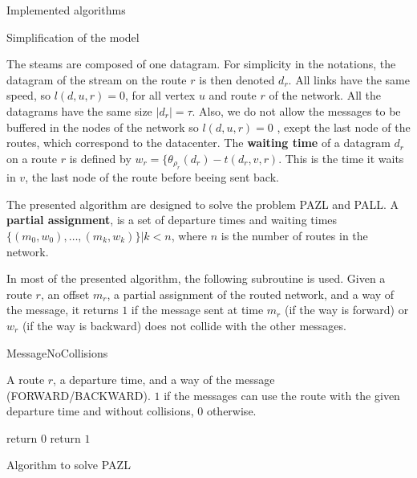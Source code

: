 \documentclass[10pt]{article}
\begin{document}
  \begin{section}{Implemented algorithms}
  
  \begin{subsection}{Simplification of the model}
 
   The steams are composed of one datagram. For simplicity in the notations, the datagram of the stream on the route $r$ is then denoted $d_r$. All links have the same speed, so $l(d,u,r)=0$, for all vertex $u$ and route $r$ of the network. All the datagrams have the same size $|d_r| = \tau$.
   Also, we do not allow the messages to be buffered in the nodes of the network so $l(d,u,r)=0$ , exept the last node of the routes, which correspond to the datacenter.
   The \textbf{waiting time} of a datagram $d_r$ on a route $r$ is defined by $w_r = \{\theta_{\rho_r}(d_r) - t(d_r,v,r)$. This is the time it waits in $v$, the last node of the route before beeing sent back.
   
  \end{subsection}

  The presented algorithm are designed to solve the problem PAZL and PALL.
  A \textbf{partial assignment}, is a set of departure times and waiting times $\{(m_0,w_0),\ldots,(m_k,w_k)\}|k<n$, where $n$ is the number of routes in the network.
  
   
   
  In most of the presented algorithm, the following subroutine is used. Given a route $r$, an offset $m_r$, a partial assignment of the routed network, and a way of the message, it returns $1$ if the message sent at time $m_r$ (if the way is forward) or $w_r$ (if the way is backward)  does not collide with the other messages. 
   	\begin{algorithm}[H]
 	\caption{MessageNoCollisions}
 	\begin{algorithmic}
 	\REQUIRE A route $r$, a departure time, and a way of the message (FORWARD/BACKWARD).
	\ENSURE $1$ if the messages can use the route with the given departure time and without collisions, $0$ otherwise.

 	\STATE return $0$
 	\ENDIF
 	\ENDFOR
	\STATE return $1$
 	\end{algorithmic}
 	\end{algorithm}
 	
  \begin{subsection}{Algorithm to solve PAZL }

  


\end{subsection}
\end{section}
\end{document}
